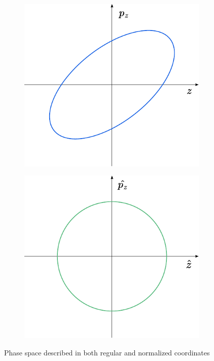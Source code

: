 \begin{figure}[H]
    \centering
    \begin{subfigure}[b]{0.4\textwidth}
        \includegraphics[width=\linewidth]{images/phase_space_regular_coordinates.pdf}
    \end{subfigure}
    \begin{subfigure}[b]{0.4\textwidth}
        \includegraphics[width=\linewidth]{images/phase_space_normalized_coordinates.pdf}
    \end{subfigure}
    \caption{Phase space described in both regular and normalized coordinates}
    \label{fig:coordinate_systems:normalized_coordinates}
\end{figure}


